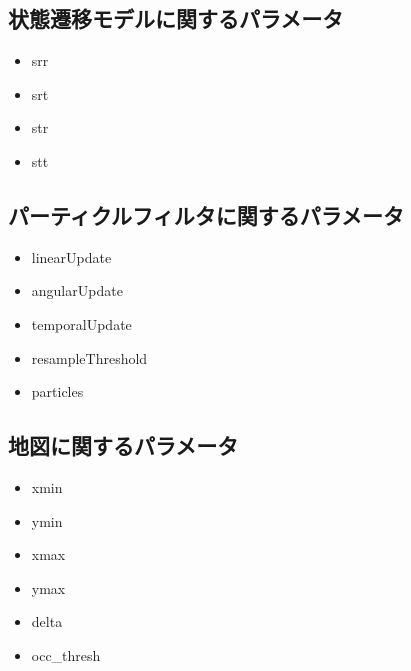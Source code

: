 \documentclass[{../../master}]{subfiles}
\begin{document}
\subsection{状態遷移モデルに関するパラメータ}

\begin{itemize}
  \item \textsf{srr}
  \item \textsf{srt}
  \item \textsf{str}
  \item \textsf{stt}
\end{itemize}

\subsection{パーティクルフィルタに関するパラメータ}

\begin{itemize}
  \item \textsf{linearUpdate}
  \item \textsf{angularUpdate}
  \item \textsf{temporalUpdate}
  \item \textsf{resampleThreshold}
  \item \textsf{particles}
\end{itemize}

\subsection{地図に関するパラメータ}

\begin{itemize}
  \item \textsf{xmin}
  \item \textsf{ymin}
  \item \textsf{xmax}
  \item \textsf{ymax}
  \item \textsf{delta}
  \item \textsf{occ\_thresh}
\end{itemize}
\end{document}
